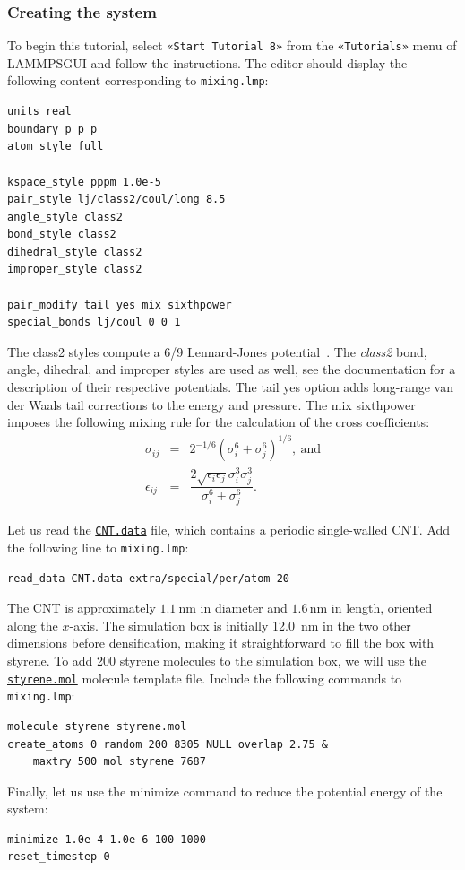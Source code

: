 \documentclass[9pt,tutorial]{livecoms}
\newcommand{\lmpcmd}[1]{\hspace{0pt}\colorbox{listing}{\textcolor{command}{\small{#1}}}\hspace{0pt}} %
\newcommand{\flecmd}[1]{\textcolor{command}{\texttt{#1}}} %
\newcommand{\guicmd}[1]{\textcolor{command}{\texttt{«#1»}}} %
\newcommand{\dwlcmd}[1]{\textcolor{download}{\texttt{#1}}} %
\newcommand{\lammpsgui}{\textsf{LAMMPS\textendash GUI}}
\newcommand{\filepath}{https://raw.githubusercontent.com/lammpstutorials/lammpstutorials-article/main/files/}
\begin{document}
\subsubsection{Creating the system}

To begin this tutorial, select \guicmd{Start Tutorial 8} from the
\guicmd{Tutorials} menu of \lammpsgui{} and follow the instructions.
The editor should display the following content corresponding to \flecmd{mixing.lmp}:
\begin{lstlisting}
units real
boundary p p p
atom_style full

kspace_style pppm 1.0e-5
pair_style lj/class2/coul/long 8.5
angle_style class2
bond_style class2
dihedral_style class2
improper_style class2

pair_modify tail yes mix sixthpower
special_bonds lj/coul 0 0 1
\end{lstlisting}
The \lmpcmd{class2} styles compute a 6/9 Lennard-Jones potential~\cite{sun1998compass}.
The \textit{class2} bond, angle, dihedral, and improper styles are used as
well, see the documentation for a description of their respective potentials.
{\color{blue}The \lmpcmd{tail yes} option adds long-range van der Waals tail
corrections to the energy and pressure.}
The \lmpcmd{mix sixthpower} imposes the following mixing rule for the calculation
of the cross coefficients:
\begin{eqnarray}
\nonumber
\sigma_{ij} & = & 2^{-1/6} (\sigma^6_i+\sigma_j^6)^{1/6}, ~ \text{and} \\
\nonumber
\epsilon_{ij} & = & \dfrac{2 \sqrt{\epsilon_i \epsilon_j} \sigma^3_i \sigma^3_j}{\sigma^6_i+\sigma_j^6}.
\end{eqnarray}

Let us read the \href{\filepath tutorial8/CNT.data}{\dwlcmd{CNT.data}} file, which
contains a periodic single-walled CNT.  Add the following line to \flecmd{mixing.lmp}:
\begin{lstlisting}
read_data CNT.data extra/special/per/atom 20
\end{lstlisting}
The CNT is approximately $1.1~\text{nm}$ in diameter and $1.6\,\text{nm}$ in length, oriented
along the $x$-axis. The simulation box is initially 12.0~nm in the two other dimensions before densification,
making it straightforward to fill the box with styrene.
To add 200 styrene molecules to the simulation box, we will use the
\href{\filepath tutorial8/styrene.mol}{\dwlcmd{styrene.mol}} molecule template file.
Include the following commands to \flecmd{mixing.lmp}:
\begin{lstlisting}
molecule styrene styrene.mol
create_atoms 0 random 200 8305 NULL overlap 2.75 &
    maxtry 500 mol styrene 7687
\end{lstlisting}
Finally, let us use the \lmpcmd{minimize} command to reduce the potential energy of the system:
\begin{lstlisting}
minimize 1.0e-4 1.0e-6 100 1000
reset_timestep 0
\end{lstlisting}
\end{document}
